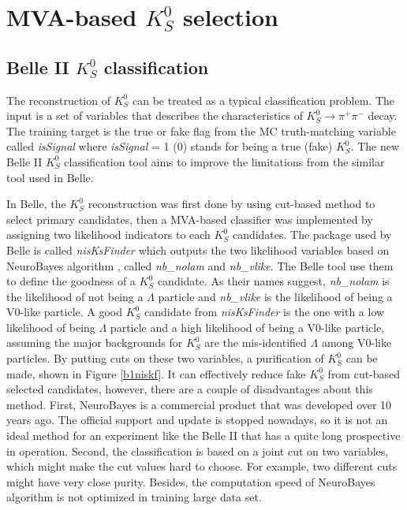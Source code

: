 \begin{comment}
\begin{figure}[htpb]
\centering
\texttt{[image: VXDGEO.png]}
\caption{Geometric structure of PXD and SVD in Belle II\cite{Abe:2010gxa}. SVD Layer 5 is at $r = 11$ cm and $K_S^0$ that decay outside are very likely to lose SVD hits information.}
\label{fig:vxdgeo}
\end{figure}
\end{comment}





\section{MVA-based $K_S^0$ selection}

\subsection{Belle II $K_S^0$ classification}
The reconstruction of $K_S^0$ can be treated as a typical classification problem. The input is a set of variables that describes the characteristics of $K_S^0 \to \pi^+ \pi^-$ decay. The training  target is the true or fake flag from the MC truth-matching variable called \textit{isSignal} where \textit{isSignal} = 1 (0) stands for being a true (fake) $K_S^0$. The new Belle II $K_S^0$ classification tool aims to improve the limitations from the similar tool used in Belle.
 
 In Belle, the $K_S^0$ reconstruction was first done by using cut-based method to select primary candidates, then a MVA-based classifier was implemented by assigning two likelihood indicators to each $K_S^0$ candidates. The package used by Belle is called \textit{nisKsFinder} \cite{b2book} which outputs the two likelihood variables based on NeuroBayes algorithm \cite{feindt2006neurobayes}, called \textit{nb\_nolam} and \textit{nb\_vlike}. The Belle tool use them to define the goodness of a $K_S^0$ candidate. As their names suggest, \textit{nb\_nolam} is the likelihood of not being a $\Lambda$ particle and \textit{nb\_vlike} is the likelihood of being a V0-like particle. A good $K_S^0$ candidate from \textit{nisKsFinder} is the one with a low likelihood of being $\Lambda$ particle and a high likelihood of being a V0-like particle, assuming the major backgrounds for $K_S^0$ are the mis-identified $\Lambda$ among V0-like particles. By putting cuts on these two variables, a purification of $K_S^0$ can be made, shown in Figure \ref{b1niskf}. It can effectively reduce fake $K_S^0$ from cut-based selected candidates, however, there are a couple of disadvantages about this method. First, NeuroBayes is a commercial product that was developed over 10 years ago. The official support and update is stopped nowadays, so it is not an ideal method for an experiment like the Belle II that has a quite long prospective in operation. Second, the classification is based on a joint cut on two variables, which might make the cut values hard to choose. For example, two different cuts might have very close purity. Besides, the computation speed of NeuroBayes algorithm is not optimized in training large data set.

